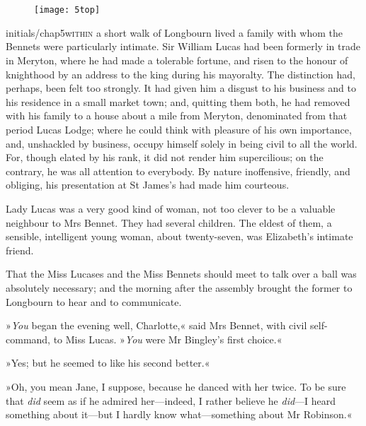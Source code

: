 
\chapter[Chapter \thechapter]{}
\begin{figure}[t!]
\centering
\texttt{[image: 5top]}
\end{figure}

\lettrine[lines=6,image=true]{initials/chap5w}{ithin}  a short walk of Longbourn lived a family with whom the Bennets were particularly intimate. Sir William Lucas had been formerly in trade in Meryton, where he had made a tolerable fortune, and risen to the honour of knighthood by an address to the king during his mayoralty. The distinction had, perhaps, been felt too strongly. It had given him a disgust to his business and to his residence in a small market town; and, quitting them both, he had removed with his family to a house about a mile from Meryton, denominated from that period Lucas Lodge; where he could think with pleasure of his own importance, and, unshackled by business, occupy himself solely in being civil to all the world. For, though elated by his rank, it did not render him supercilious; on the contrary, he was all attention to everybody. By nature inoffensive, friendly, and obliging, his presentation at St James's had made him courteous.

Lady Lucas was a very good kind of woman, not too clever to be a valuable neighbour to Mrs Bennet. They had several children. The eldest of them, a sensible, intelligent young woman, about twenty-seven, was Elizabeth's intimate friend.

That the Miss Lucases and the Miss Bennets should meet to talk over a ball was absolutely necessary; and the morning after the assembly brought the former to Longbourn to hear and to communicate.

»\textit{You} began the evening well, Charlotte,« said Mrs Bennet, with civil self-command, to Miss Lucas. »\textit{You} were Mr Bingley's first choice.«

»Yes; but he seemed to like his second better.«

»Oh, you mean Jane, I suppose, because he danced with her twice. To be sure that \textit{did} seem as if he admired her—indeed, I rather believe he \textit{did}—I heard something about it—but I hardly know what—something about Mr Robinson.«

